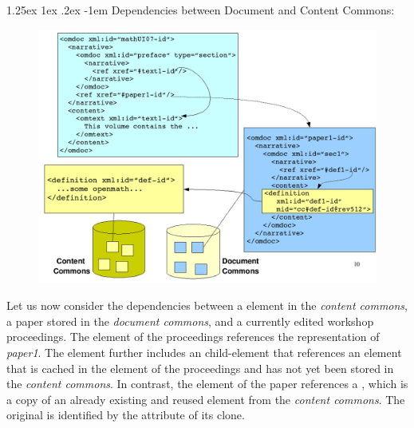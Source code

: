 \documentclass[pdftex,bibtotocnumbered,idxtotoc,11pt]{scrartcl}
\makeatletter
\renewcommand\paragraph{\@startsection{paragraph}{4}{\z@}%
{1.25ex \@plus1ex \@minus.2ex}%
{-1em}%
{\setlength{\parfillskip}{\z@ \@plus 1fil}%
\raggedsection\normalfont\sectfont\nobreak
\size@paragraph\nobreak}}
\makeatother
\begin{document}
\paragraph{Dependencies between Document and Content Commons:} 
\begin{figure}\vspace*{-.5em}
\includegraphics[width=.5\textwidth]{img/docsAndCommons.png}\vspace*{-.5em}
\end{figure}
Let us now consider the dependencies between a {} element in the
{\emph{content commons}}, a paper stored in the {\emph{document commons}}, and a currently
edited workshop proceedings. The {} element of the proceedings
references the {\omdoc} representation of {\emph{paper1}}. The {}
element further includes an {} child-element that references an
{} element that is cached in the {} element of the
proceedings and has not yet been stored in the {\emph{content commons}}. In contrast, the
{} element of the paper references a {}, which is a
copy of an already existing and reused element from the {\emph{content commons}}. The
original {} is identified by the {} attribute of its
clone.


\end{document}

